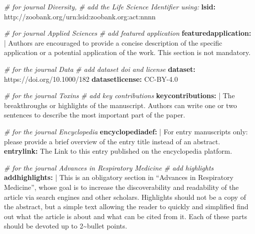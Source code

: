 \documentclass[notspecified,article,submit,moreauthors,pdftex]{Definitions/mdpi}
\newenvironment{Shaded}{\begin{snugshade}}{\end{snugshade}}
\newcommand{\AttributeTok}[1]{\textcolor[rgb]{0.13,0.29,0.53}{#1}}
\newcommand{\CharTok}[1]{\textcolor[rgb]{0.31,0.60,0.02}{#1}}
\newcommand{\CommentTok}[1]{\textcolor[rgb]{0.56,0.35,0.01}{\textit{#1}}}
\newcommand{\FunctionTok}[1]{\textcolor[rgb]{0.13,0.29,0.53}{\textbf{#1}}}
\newcommand{\KeywordTok}[1]{\textcolor[rgb]{0.13,0.29,0.53}{\textbf{#1}}}
\newcommand{\NormalTok}[1]{#1}
\begin{document}
\begin{Shaded}
\begin{Highlighting}[]
\CommentTok{\# for journal Diversity,}
\CommentTok{\# add the Life Science Identifier using:}
\FunctionTok{lsid}\KeywordTok{:}\AttributeTok{ http://zoobank.org/urn:lsid:zoobank.org:act:nnnn}


\CommentTok{\# for journal Applied Sciences}
\CommentTok{\# add featured application}
\FunctionTok{featuredapplication}\KeywordTok{: }\CharTok{|}
\NormalTok{  Authors are encouraged to provide a concise }
\NormalTok{  description of the specific application or }
\NormalTok{  a potential application of the work. This }
\NormalTok{  section is not mandatory.}

\CommentTok{\# for the journal Data}
\CommentTok{\# add dataset doi and license}
\FunctionTok{dataset}\KeywordTok{:}\AttributeTok{ https://doi.org/10.1000/182}
\FunctionTok{datasetlicense}\KeywordTok{:}\AttributeTok{ CC{-}BY{-}4.0}

\CommentTok{\# for the journal Toxins}
\CommentTok{\# add key contributions}
\FunctionTok{keycontributions}\KeywordTok{: }\CharTok{|}
\NormalTok{  The breakthroughs or highlights of the manuscript. }
\NormalTok{  Authors can write one or two sentences to describe }
\NormalTok{  the most important part of the paper.}

\CommentTok{\# for the journal Encyclopedia}
\FunctionTok{encyclopediadef}\KeywordTok{: }\CharTok{|}
\NormalTok{  For entry manuscripts only: please provide a brief overview}
\NormalTok{  of the entry title instead of an abstract.}
\FunctionTok{entrylink}\KeywordTok{:}\AttributeTok{ The Link to this entry published on the encyclopedia platform.}

\CommentTok{\# for the journal Advances in Respiratory Medicine}
\CommentTok{\# add highlights}
\FunctionTok{addhighlights}\KeywordTok{: }\CharTok{|}
\NormalTok{  This is an obligatory section in “Advances in Respiratory Medicine”, }
\NormalTok{  whose goal is to increase the discoverability and readability of the}
\NormalTok{  article via search engines and other scholars. Highlights should not }
\NormalTok{  be a copy of the abstract, but a simple text allowing the reader to }
\NormalTok{  quickly and simplified find out what the article is about and what can }
\NormalTok{  be cited from it. Each of these parts should be devoted up to 2\textasciitilde{}bullet }
\NormalTok{  points.}
\end{Highlighting}
\end{Shaded}
\end{document}
